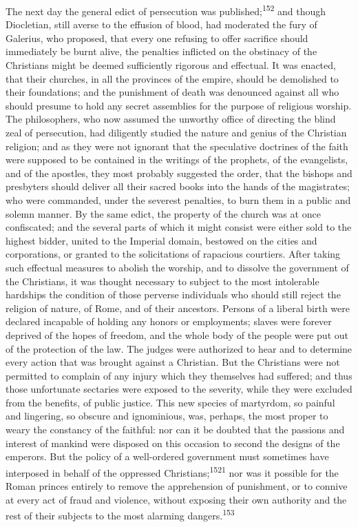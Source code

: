 The next day the general edict of persecution was published;\textsuperscript{152}
and though Diocletian, still averse to the effusion of blood, had
moderated the fury of Galerius, who proposed, that every one
refusing to offer sacrifice should immediately be burnt alive,
the penalties inflicted on the obstinacy of the Christians might
be deemed sufficiently rigorous and effectual. It was enacted,
that their churches, in all the provinces of the empire, should
be demolished to their foundations; and the punishment of death
was denounced against all who should presume to hold any secret
assemblies for the purpose of religious worship. The
philosophers, who now assumed the unworthy office of directing
the blind zeal of persecution, had diligently studied the nature
and genius of the Christian religion; and as they were not
ignorant that the speculative doctrines of the faith were
supposed to be contained in the writings of the prophets, of the
evangelists, and of the apostles, they most probably suggested
the order, that the bishops and presbyters should deliver all
their sacred books into the hands of the magistrates; who were
commanded, under the severest penalties, to burn them in a public
and solemn manner. By the same edict, the property of the church
was at once confiscated; and the several parts of which it might
consist were either sold to the highest bidder, united to the
Imperial domain, bestowed on the cities and corporations, or
granted to the solicitations of rapacious courtiers. After taking
such effectual measures to abolish the worship, and to dissolve
the government of the Christians, it was thought necessary to
subject to the most intolerable hardships the condition of those
perverse individuals who should still reject the religion of
nature, of Rome, and of their ancestors. Persons of a liberal
birth were declared incapable of holding any honors or
employments; slaves were forever deprived of the hopes of
freedom, and the whole body of the people were put out of the
protection of the law. The judges were authorized to hear and to
determine every action that was brought against a Christian. But
the Christians were not permitted to complain of any injury which
they themselves had suffered; and thus those unfortunate
sectaries were exposed to the severity, while they were excluded
from the benefits, of public justice. This new species of
martyrdom, so painful and lingering, so obscure and ignominious,
was, perhaps, the most proper to weary the constancy of the
faithful: nor can it be doubted that the passions and interest of
mankind were disposed on this occasion to second the designs of
the emperors. But the policy of a well-ordered government must
sometimes have interposed in behalf of the oppressed Christians;\textsuperscript{1521}
nor was it possible for the Roman princes entirely to remove
the apprehension of punishment, or to connive at every act of
fraud and violence, without exposing their own authority and the
rest of their subjects to the most alarming dangers.\textsuperscript{153}

